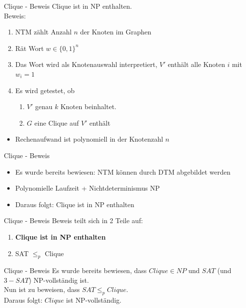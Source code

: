 \documentclass[12pt,donthandout,notes=dontshow,xcolor=table]{beamer}
\begin{document}
\begin{frame}{Clique - Beweis}
Clique ist in NP enthalten.\\
Beweis:\\
\begin{enumerate}
\item NTM zählt Anzahl \(n\) der Knoten im Graphen
\pause
\item Rät Wort \(w \in \{0,1\}^n\)
\pause
\item Das Wort wird als Knotenauswahl interpretiert, \(V'\) enthält alle Knoten \(i\) mit \(w_i = 1\)
\pause
\item Es wird getestet, ob
\begin{enumerate}
\item \(V'\) genau \(k\) Knoten beinhaltet.
\item \(G\) eine Clique auf \(V'\) enthält
\end{enumerate}
\end{enumerate}
\pause
\begin{itemize}
\item Rechenaufwand ist polynomiell in der Knotenzahl \(n\)
\end{itemize}
\end{frame}

\begin{frame}{Clique - Beweis}
\begin{itemize}
\item Es wurde bereits bewiesen: NTM können durch DTM abgebildet werden
\item Polynomielle Laufzeit + Nichtdeterminismus \textrightarrow NP
\item Daraus folgt: Clique ist in NP enthalten
\end{itemize}
\end{frame}

\begin{frame}{Clique - Beweis}
Beweis teilt sich in 2 Teile auf:
\begin{enumerate}
\item \textbf{Clique ist in NP enthalten} \checkmark
\item SAT $\le_p$ Clique
\end{enumerate}
\end{frame}

\begin{frame}{Clique - Beweis}
Es wurde bereits bewiesen, dass \(Clique \in NP\) und \(SAT\) (und \(3-SAT\)) NP-vollständig ist.\\
Nun ist zu beweisen, dass \(SAT \leq_p Clique\).\\
Daraus folgt: \(Clique\) ist NP-vollständig.
\end{frame}
\end{document}
